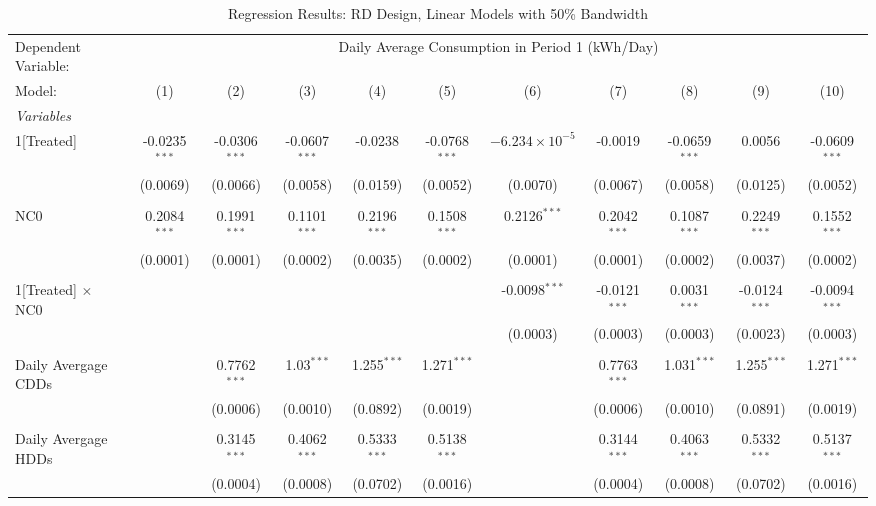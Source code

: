 \begin{table}[htbp]
\centering
\caption{\label{Table:Regression-Results_RD_Linear_BW-50} Regression Results: RD Design, Linear Models with 50\% Bandwidth}
\begin{adjustbox}{scale = 0.70}
\begin{tabular}{lcccccccccc}
\tabularnewline\toprule\toprule
Dependent Variable:&\multicolumn{10}{c}{Daily Average Consumption in Period 1 (kWh/Day)}\\
Model:&(1) & (2) & (3) & (4) & (5) & (6) & (7) & (8) & (9) & (10)\\
\midrule
\emph{Variables}&   &   &   &   &   &   &   &   &   &  \\
1[Treated]&-0.0235$^{***}$ & -0.0306$^{***}$ & -0.0607$^{***}$ & -0.0238 & -0.0768$^{***}$ & $-6.234\times 10^{-5}$ & -0.0019 & -0.0659$^{***}$ & 0.0056 & -0.0609$^{***}$\\
  &(0.0069) & (0.0066) & (0.0058) & (0.0159) & (0.0052) & (0.0070) & (0.0067) & (0.0058) & (0.0125) & (0.0052)\\
& & & & & & & & & & \\
NC0&0.2084$^{***}$ & 0.1991$^{***}$ & 0.1101$^{***}$ & 0.2196$^{***}$ & 0.1508$^{***}$ & 0.2126$^{***}$ & 0.2042$^{***}$ & 0.1087$^{***}$ & 0.2249$^{***}$ & 0.1552$^{***}$\\
  &(0.0001) & (0.0001) & (0.0002) & (0.0035) & (0.0002) & (0.0001) & (0.0001) & (0.0002) & (0.0037) & (0.0002)\\
& & & & & & & & & & \\
1[Treated] $\times $ NC0&   &    &    &    &    & -0.0098$^{***}$ & -0.0121$^{***}$ & 0.0031$^{***}$ & -0.0124$^{***}$ & -0.0094$^{***}$\\
  &   &    &    &    &    & (0.0003) & (0.0003) & (0.0003) & (0.0023) & (0.0003)\\
& & & & & & & & & & \\
Daily Avergage CDDs&   & 0.7762$^{***}$ & 1.03$^{***}$ & 1.255$^{***}$ & 1.271$^{***}$ &    & 0.7763$^{***}$ & 1.031$^{***}$ & 1.255$^{***}$ & 1.271$^{***}$\\
  &   & (0.0006) & (0.0010) & (0.0892) & (0.0019) &    & (0.0006) & (0.0010) & (0.0891) & (0.0019)\\
& & & & & & & & & & \\
Daily Avergage HDDs&   & 0.3145$^{***}$ & 0.4062$^{***}$ & 0.5333$^{***}$ & 0.5138$^{***}$ &    & 0.3144$^{***}$ & 0.4063$^{***}$ & 0.5332$^{***}$ & 0.5137$^{***}$\\
  &   & (0.0004) & (0.0008) & (0.0702) & (0.0016) &    & (0.0004) & (0.0008) & (0.0702) & (0.0016)\\

\end{tabular}
\end{adjustbox}
\end{table}

